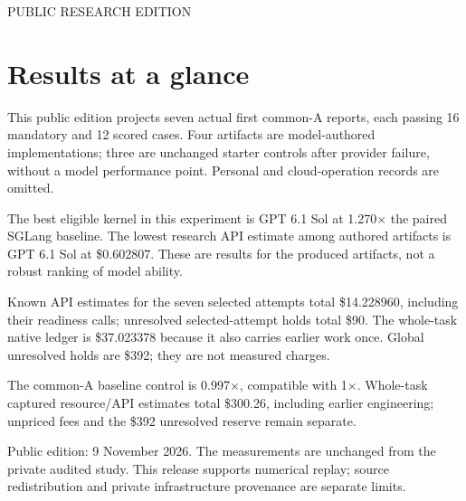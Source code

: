 \documentclass[11pt,letterpaper]{article}
\newcommand{\keypoint}[1]{\par\medskip\noindent\colorbox{pale}{\parbox{\dimexpr\linewidth-2\fboxsep\relax}{\vspace{5pt}#1\vspace{5pt}}}\par\medskip}
\begin{document}
{\sffamily\color{teal}\large PUBLIC RESEARCH EDITION\par}


\vspace{.12in}{\color{gold}\rule{\linewidth}{1.5pt}}

\section*{Results at a glance}

This public edition projects seven actual first common-A reports, each passing 16 mandatory and 12 scored cases. Four artifacts are model-authored implementations; three are unchanged starter controls after provider failure, without a model performance point. Personal and cloud-operation records are omitted.

\keypoint{The best eligible kernel in this experiment is GPT 6.1 Sol at 1.270$\times$ the paired SGLang baseline. The lowest research API estimate among authored artifacts is GPT 6.1 Sol at \$0.602807. These are results for the produced artifacts, not a robust ranking of model ability.}

Known API estimates for the seven selected attempts total \$14.228960, including their readiness calls; unresolved selected-attempt holds total \$90. The whole-task native ledger is \$37.023378 because it also carries earlier work once. Global unresolved holds are \$392; they are not measured charges.

The common-A baseline control is 0.997$\times$, compatible with 1$\times$. Whole-task captured resource/API estimates total \$300.26, including earlier engineering; unpriced fees and the \$392 unresolved reserve remain separate.

Public edition: 9 November 2026. The measurements are unchanged from the private audited study. This release supports numerical replay; source redistribution and private infrastructure provenance are separate limits.
\end{document}
